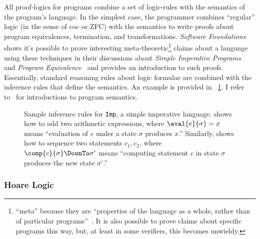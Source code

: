 All proof-logics for programs combine a set of logic-rules with the semantics of
the program's language. In the simplest case, the programmer combines
``regular'' logic (in the sense of \gls{coc} or ZFC) with the semantics to write
proofs about program equivalences, termination, and transformations.
\emph{Software Foundations} shows it's possible to prove interesting
meta-theoretic\footnote{``meta'' because they are ``properties of the language
as a whole, rather than of particular programs''~\cite{Pierce:SF2}. It is also
possible to prove claims about specific programs this way, but, at least in some
verifiers, this becomes unwieldy.} claims about a language using these techniques
in their discussions about \emph{Simple Imperative Programs}~\cite{Pierce:SF1}
and \emph{Program Equivalence}~\cite{Pierce:SF2} and provides an introduction to
such proofs. Essentially, standard reasoning rules about logic formulae are
combined with the inference rules that define the semantics. An example is
provided in \figurename~\ref{F:Imp_ex}. I refer
to~\cite{Winskel_1993,Harper_2016} for introductions to program semantics.

\begin{figure}
    \centering
    \caption{Sample inference rules for \texttt{Imp}, a simple imperative
    language.  shows how to add two arithmetic expressions, where
    \(\eval{e}{\sigma} = x\) means ``evaluation of \(e\) under a state
    \(\sigma\) produces \(x\).'' Similarly,  shows how to sequence
    two statements \(c_1, c_2\), where \(\comp{c}{\sigma} \DownTo \sigma'\)
    means ``computing statement \(c\) in state \(\sigma\) produces the new state
    \(\sigma'\).''}\label{F:Imp_ex}
\end{figure}

\subsubsection{Hoare Logic}

